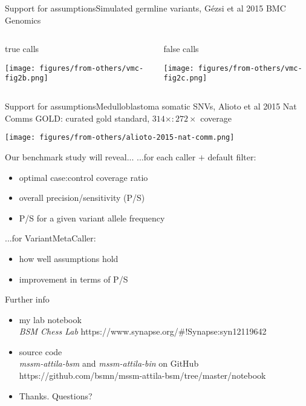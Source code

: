 \documentclass{beamer}
\begin{document}
\begin{frame}{Support for assumptions}{Simulated germline
variants, G\'ezsi et al 2015 BMC Genomics}
\begin{columns}[t]
\begin{column}{0.5\textwidth}{true calls}

\texttt{[image: figures/from-others/vmc-fig2b.png]}
\end{column}

\begin{column}{0.5\textwidth}{false calls}

\texttt{[image: figures/from-others/vmc-fig2c.png]}
\end{column}
\end{columns}
\end{frame}

\begin{frame}{Support for assumptions}{Medulloblastoma
somatic SNVs, Alioto et al 2015 Nat Comms}{}
GOLD: curated gold standard, \(314\times
: 272\times\)
coverage

\texttt{[image: figures/from-others/alioto-2015-nat-comm.png]}
\end{frame}


\begin{frame}{Our benchmark study will reveal...}
...for each caller \(+\) default filter:
\begin{itemize}
\item optimal case:control coverage ratio 
\item overall precision/sensitivity (P/S)
\item P/S for a given variant allele frequency 
\end{itemize}
\vfill
...for VariantMetaCaller:
\begin{itemize}
\item how well assumptions hold
\item improvement in terms of P/S
\end{itemize}
\end{frame}

\begin{frame}{Further info}
\begin{itemize}
\item \alert{my lab notebook} \\
\emph{BSM Chess Lab}
https://www.synapse.org/#!Synapse:syn12119642
\item \alert{source code} \\
\emph{mssm-attila-bsm} and \emph{mssm-attila-bin} on GitHub \\
https://github.com/bsmn/mssm-attila-bsm/tree/master/notebook 
\item<2> Thanks. Questions? 
\end{itemize}
\end{frame}
\end{document}
